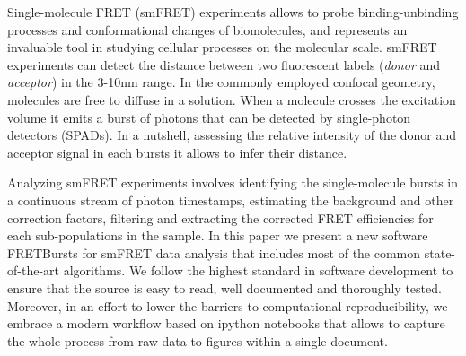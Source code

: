 Single-molecule FRET (smFRET) experiments allows to probe binding-unbinding processes and conformational changes of biomolecules, and represents an invaluable tool in studying cellular processes on the molecular scale\cite{Kapanidis_2006}. smFRET experiments can detect the distance between two fluorescent labels (\textit{donor} and \textit{acceptor}) in the 3-10nm range. In the commonly employed confocal geometry, molecules are free to diffuse in a solution. When a molecule crosses the excitation volume it emits a burst of photons that can be detected by single-photon detectors (SPADs). In a nutshell, assessing the relative intensity of the donor and acceptor signal in each bursts it allows to infer their distance. 

Analyzing smFRET experiments involves identifying the single-molecule bursts in a continuous stream of photon timestamps, estimating the background and other correction factors, filtering and extracting the corrected FRET efficiencies for each sub-populations in the sample. In this paper we present a new software FRETBursts for smFRET data analysis that includes most of the common state-of-the-art algorithms. We follow the highest standard in software development to ensure that the source is easy to read, well documented and thoroughly tested. Moreover, in an effort to lower the barriers to computational reproducibility, we embrace a modern workflow based on ipython notebooks that allows to capture the whole process from raw data to figures within a single document.
